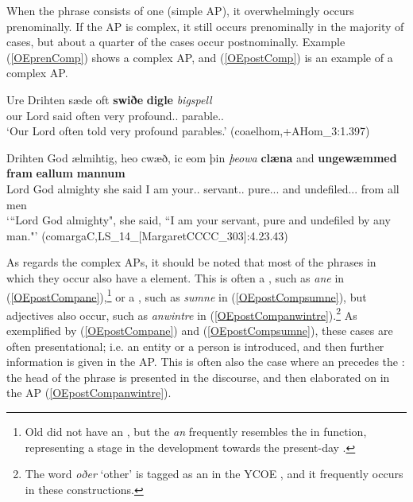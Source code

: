 \documentclass[output=paper,colorlinks,citecolor=brown,draft]{langscibook}
\begin{document}
When the  phrase consists of one  (simple AP), it overwhelmingly occurs prenominally. If the AP is complex, it still occurs prenominally in the majority of cases, but about a quarter of the cases occur postnominally. Example (\ref{OEprenComp}) shows a  complex AP, and (\ref{OEpostComp}) is an example of a  complex AP.

\ea\label{OEprenComp}
\gll Ure Drihten sæde oft \textbf{swiðe} \textbf{digle} \textit{bigspell}\\
our Lord said often very profound.\ACC.\PL{} parable.\ACC.\PL{}\\
\glt ‘Our Lord often told very profound parables.' (coaelhom,+AHom\_3:1.397)
\z

 \ea\label{OEpostComp}
\gll Drihten God ælmihtig, heo cwæð, ic eom þin \textit{þeowa} \textbf{clæna} and \textbf{ungewæmmed} \textbf{fram} \textbf{eallum} \textbf{mannum}\\
Lord God almighty she said I am your.\NOM.\SG{} servant.\NOM.\SG{} pure.\NOM.\SG.\STR{} and undefiled.\NOM.\SG.\STR{} from all men\\
\glt ‘“Lord God almighty", she said, “I am your servant, pure and undefiled by any man."’ (comargaC,LS\_14\_[MargaretCCCC\_303]:4.23.43)
\z

As regards the  complex APs, it should be noted that most of the  phrases in which they occur also have a  element. This is often a , such as \textit{ane} in (\ref{OEpostCompane}),\footnote{Old  did not have an  , but the  \textit{an} frequently resembles the   in function, representing a stage in the development towards the present-day   \citep[261]{Rissanen67}.} or a , such as \textit{sumne} in (\ref{OEpostCompsumne}), but adjectives also occur, such as \textit{anwintre} in (\ref{OEpostCompanwintre}).\footnote{The word \textit{oðer} ‘other’ is tagged as an  in the YCOE , and it frequently occurs in these constructions.}  As exemplified by (\ref{OEpostCompane}) and (\ref{OEpostCompsumne}), these cases are often presentational; i.e. an entity or a person is introduced, and then further information is given in the  AP. This is often also the case where an  precedes the : the head of the  phrase is presented in the discourse, and then elaborated on in the  AP (\ref{OEpostCompanwintre}). 
\end{document}
